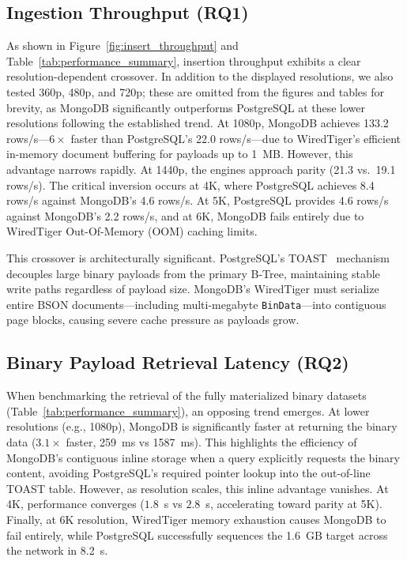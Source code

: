 \documentclass[conference]{IEEEtran}
\begin{document}
\subsection{Ingestion Throughput (RQ1)}
\label{subsec:insert_throughput}
As shown in Figure~\ref{fig:insert_throughput} and Table~\ref{tab:performance_summary}, insertion throughput exhibits a clear resolution-dependent crossover. In addition to the displayed resolutions, we also tested 360p, 480p, and 720p; these are omitted from the figures and tables for brevity, as MongoDB significantly outperforms PostgreSQL at these lower resolutions following the established trend. At 1080p, MongoDB achieves 133.2 rows/s---$6\times$ faster than PostgreSQL's 22.0 rows/s---due to WiredTiger's efficient in-memory document buffering for payloads up to 1~MB. However, this advantage narrows rapidly. At 1440p, the engines approach parity (21.3 vs.\ 19.1 rows/s). The critical inversion occurs at 4K, where PostgreSQL achieves 8.4 rows/s against MongoDB's 4.6 rows/s. At 5K, PostgreSQL provides 4.6 rows/s against MongoDB's 2.2 rows/s, and at 6K, MongoDB fails entirely due to WiredTiger Out-Of-Memory (OOM) caching limits.

This crossover is architecturally significant. PostgreSQL's TOAST~\cite{postgresql_toast_docs} mechanism decouples large binary payloads from the primary B-Tree, maintaining stable write paths regardless of payload size. MongoDB's WiredTiger must serialize entire BSON documents---including multi-megabyte \texttt{BinData}---into contiguous page blocks, causing severe cache pressure as payloads grow.

\subsection{Binary Payload Retrieval Latency (RQ2)}
\label{subsec:retrieval_latency}
When benchmarking the retrieval of the fully materialized binary datasets (Table~\ref{tab:performance_summary}), an opposing trend emerges. At lower resolutions (e.g., 1080p), MongoDB is significantly faster at returning the binary data ($3.1\times$ faster, 259~ms vs 1587~ms). This highlights the efficiency of MongoDB's contiguous inline storage when a query explicitly requests the binary content, avoiding PostgreSQL's required pointer lookup into the out-of-line TOAST table. However, as resolution scales, this inline advantage vanishes. At 4K, performance converges ($1.8$~s vs $2.8$~s, accelerating toward parity at 5K). Finally, at 6K resolution, WiredTiger memory exhaustion causes MongoDB to fail entirely, while PostgreSQL successfully sequences the 1.6~GB target across the network in 8.2~s.
\end{document}
